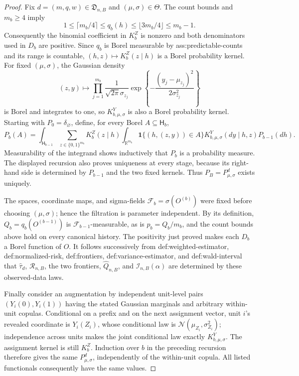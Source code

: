 \documentclass{article}
\begin{document}
\begin{proof}
Fix \(d=(m,q,w)\in\mathfrak D_{n,B}\) and \((\mu,\sigma)\in\Theta\).  The count bounds and \(m_b\geq4\) imply
\[
1\leq \lceil m_b/4\rceil\leq q_b(h)\leq\lfloor3m_b/4\rfloor\leq m_b-1.
\]
Consequently the binomial coefficient in \(K_b^Z\) is nonzero and both denominators used in \(D_b\) are positive.  Since \(q_b\) is Borel measurable by ass:predictable-counts and its range is countable, \((h,z)\mapsto K_b^Z(z\mid h)\) is a Borel probability kernel.  For fixed \((\mu,\sigma)\), the Gaussian density
\[
(z,y)\longmapsto \prod_{j=1}^{m_b}
 \frac{1}{\sqrt{2\pi}\sigma_{z_j}}
 \exp\!\left\{-\frac{(y_j-\mu_{z_j})^2}{2\sigma_{z_j}^2}\right\}
\]
is Borel and integrates to one, so \(K_{b,\mu,\sigma}^Y\) is also a Borel probability kernel.  Starting with \(P_0=\delta_{\varnothing}\), define, for every Borel \(A\subseteq\mathsf H_b\),
\[
P_b(A)=\int_{\mathsf H_{b-1}}\sum_{z\in\{0,1\}^{m_b}}
 K_b^Z(z\mid h)\int_{\mathbb R^{m_b}}
 \mathbf 1\{(h,(z,y))\in A\}K_{b,\mu,\sigma}^Y(dy\mid h,z)P_{b-1}(dh).
\]
Measurability of the integrand shows inductively that \(P_b\) is a probability measure.  The displayed recursion also proves uniqueness at every stage, because its right-hand side is determined by \(P_{b-1}\) and the two fixed kernels.  Thus \(P_B=P^d_{\mu,\sigma}\) exists uniquely.

The spaces, coordinate maps, and sigma-fields \(\mathcal F_b=\sigma(O^{(b)})\) were fixed before choosing \((\mu,\sigma)\); hence the filtration is parameter independent.  By its definition, \(Q_b=q_b(O^{(b-1)})\) is \(\mathcal F_{b-1}\)-measurable, as is \(p_b=Q_b/m_b\), and the count bounds above hold on every canonical history.  The positivity just proved makes each \(D_b\) a Borel function of \(O\).  It follows successively from def:weighted-estimator, def:normalized-risk, def:frontiers, def:variance-estimator, and def:wald-interval that \(\widehat\tau_d\), \(\mathcal R_{n,B}\), the two frontiers, \(\widehat Q_{n,B}\), and \(\mathcal I_{n,B}(\alpha)\) are determined by these observed-data laws.

Finally consider an augmentation by independent unit-level pairs \((Y_i(0),Y_i(1))\) having the stated Gaussian marginals and arbitrary within-unit copulas.  Conditional on a prefix and on the next assignment vector, unit \(i\)'s revealed coordinate is \(Y_i(Z_i)\), whose conditional law is \(\mathcal N(\mu_{Z_i},\sigma_{Z_i}^2)\); independence across units makes the joint conditional law exactly \(K_{b,\mu,\sigma}^Y\).  The assignment kernel is still \(K_b^Z\).  Induction over \(b\) in the preceding recursion therefore gives the same \(P^d_{\mu,\sigma}\), independently of the within-unit copula.  All listed functionals consequently have the same values.
\end{proof}
\end{document}
